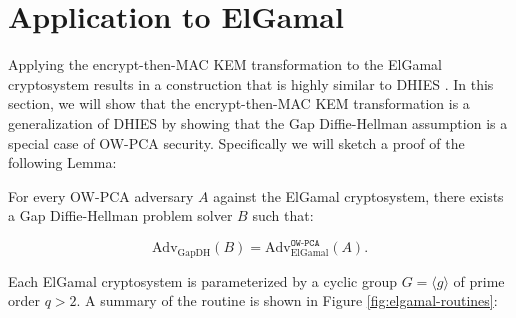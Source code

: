 \documentclass[runningheads]{llncs}
\begin{document}
\section{Application to ElGamal}\label{sec:application-to-elgamal}
Applying the encrypt-then-MAC KEM transformation to the ElGamal cryptosystem results in a construction that is highly similar to DHIES \cite{DBLP:conf/ctrsa/AbdallaBR01}. In this section, we will show that the encrypt-then-MAC KEM transformation is a generalization of DHIES by showing that the Gap Diffie-Hellman assumption is a special case of OW-PCA security. Specifically we will sketch a proof of the following Lemma:

\begin{lemma}\label{lemma:elgamal-is-ow-pca}
    For every OW-PCA adversary $A$ against the ElGamal cryptosystem, there exists a Gap Diffie-Hellman problem solver $B$ such that:

    \begin{equation*}
        \text{Adv}_\text{GapDH}(B) = \text{Adv}_\text{ElGamal}^\texttt{OW-PCA}(A).
    \end{equation*}
\end{lemma}

Each ElGamal cryptosystem \cite{DBLP:journals/tit/Elgamal85} is parameterized by a cyclic group $G = \langle g \rangle$ of prime order $q > 2$. A summary of the routine is shown in Figure \ref{fig:elgamal-routines}:
\end{document}

